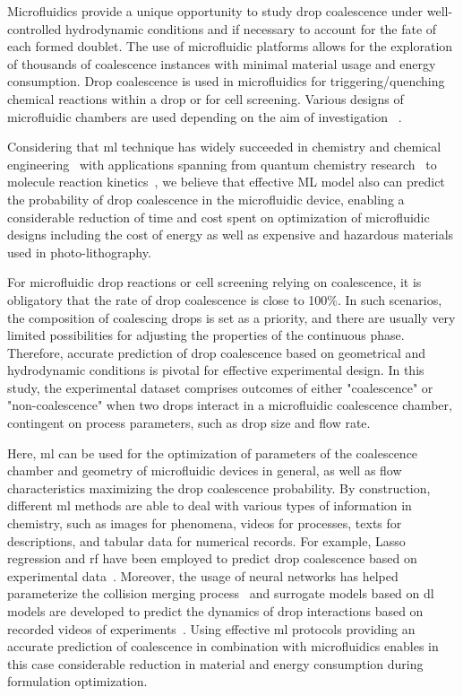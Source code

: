 \documentclass[twoside,twocolumn,9pt]{article}
\begin{document}
Microfluidics provide a unique opportunity to study drop coalescence under well-controlled hydrodynamic conditions and if necessary to account for the fate of each formed doublet. The use of microfluidic platforms allows for the exploration of thousands of coalescence instances with minimal material usage and energy consumption. Drop coalescence is used in microfluidics for triggering/quenching chemical reactions within a drop or for cell screening. Various designs of microfluidic chambers are used depending on the aim of investigation ~\cite{krebs2012microfluidic, liu2016droplet, shenoy2016stokes, niu2008pillar}. 

Considering that \acrfull*{ml} technique has widely succeeded in chemistry and chemical engineering~\cite{keith2021combining} with applications spanning from quantum chemistry research~\cite{dral2020quantum} to molecule reaction kinetics~\cite{meuwly2021machine}, we believe that effective ML model also can predict the probability of drop coalescence in the microfluidic device, enabling a considerable reduction of time and cost spent on optimization of microfluidic designs including the cost of energy as well as expensive and hazardous materials used in photo-lithography.

For microfluidic drop reactions or cell screening relying on coalescence, it is obligatory that the rate of drop coalescence is close to 100\%. In such scenarios, the composition of coalescing drops is set as a priority, and there are usually very limited possibilities for adjusting the properties of the continuous phase. Therefore, accurate prediction of drop coalescence based on geometrical and hydrodynamic conditions is pivotal for effective experimental design. In this study, the experimental dataset comprises outcomes of either "coalescence" or "non-coalescence" when two drops interact in a microfluidic coalescence chamber, contingent on process parameters, such as drop size and flow rate.

Here, \acrshort*{ml} can be used for the optimization of parameters of the coalescence chamber and geometry of microfluidic devices in general, as well as flow characteristics maximizing the drop coalescence probability. By construction, different \acrshort*{ml} methods are able to deal with various types of information in chemistry, such as images for phenomena, videos for processes, texts for descriptions, and tabular data for numerical records. For example, Lasso regression and \acrfull*{rf} have been employed to predict drop coalescence based on experimental data~\cite{wikramanayake2020statistical}.  Moreover, the usage of neural networks has helped parameterize the collision merging process~\cite{rodriguez2022parameterization} and surrogate models based on \acrfull*{dl} models are developed to predict the dynamics of drop interactions based on recorded videos of experiments~\cite{zhuang2022ensemble}. Using effective \acrshort*{ml} protocols providing an accurate prediction of coalescence in combination with microfluidics enables in this case considerable reduction in material and energy consumption during formulation optimization. 
\end{document}
